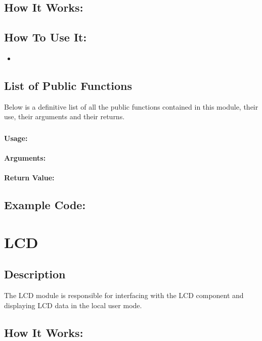 \documentclass[]{report}
\begin{document}
\section{How It Works:}

\section{How To Use It:}
\begin{itemize}
	\item 
\end{itemize}

\section{List of Public Functions}
Below is a definitive list of all the public functions contained in this module, their use, their arguments and their returns.

\subsection{}
\subsubsection{Usage:}

\subsubsection{Arguments:}

\subsubsection{Return Value:}

\section{Example Code:}

\chapter{LCD}
\section{Description}
The LCD module is responsible for interfacing with the LCD component and displaying LCD data in the local user mode.

\section{How It Works:}
\end{document}
